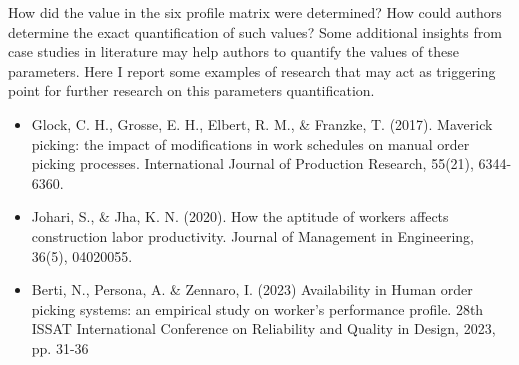 \documentclass[preprint,11pt,3p]{elsarticle}
\begin{document}
\begin{tcolorbox}[colback=r_color1,colframe=r_color2,title=Response to Q13 :]
    
			
\end{tcolorbox}
\begin{tcolorbox}[colback=q_color1,colframe=q_color2,title=Q14 :]	
    How did the value in the six profile matrix were determined? How could authors determine the exact quantification of such values? Some additional insights from case studies in literature may help authors to quantify the values of these parameters. Here I report some examples of research that may act as triggering point for further research on this parameters quantification.
    \begin{itemize}		
        \item \cite{glock2017maverick} Glock, C. H., Grosse, E. H., Elbert, R. M., \& Franzke, T. (2017). Maverick picking: the impact of modifications in work schedules on manual order picking processes. International Journal of Production Research, 55(21), 6344-6360.
        \item \cite{johari2020aptitude} Johari, S., \& Jha, K. N. (2020). How the aptitude of workers affects construction labor productivity. Journal of Management in Engineering, 36(5), 04020055.
        \item \cite{nicola2023availability} Berti, N., Persona, A. \& Zennaro, I. (2023) Availability in Human order picking systems: an empirical study on worker's performance profile. 28th ISSAT International Conference on Reliability and Quality in Design, 2023, pp. 31-36
	\end{itemize}
\end{tcolorbox}
\end{document}
